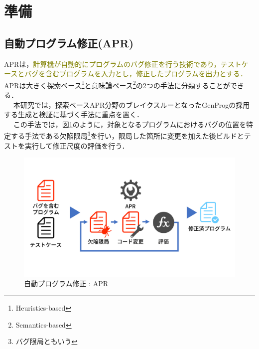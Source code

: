 \documentclass[uplatex,dvipdfmx,a4paper]{jsarticle}
\newcommand{\modifiedTwo}[1]{{\textcolor{olive}{#1}}}
\let\oldcite\cite
\renewcommand{\cite}[1]{\xspace\oldcite{#1}}
\begin{document}
\clearpage
\section{準備}\label{sec:prep}
\subsection{自動プログラム修正(APR)}\label{sec:apr}
APRは，\modifiedTwo{計算機が自動的にプログラムのバグ修正を行う技術であり，テストケースとバグを含むプログラムを入力とし，修正したプログラムを出力とする．}APRは大きく探索ベース\footnote{Heuristics-based}と意味論ベース\footnote{Semantics-based}\cite{le2018overfitting}の2つの手法に分類することができる．\\　
本研究では，探索ベースAPR分野のブレイクスルーとなったGenProg\cite{le2011genprog}の採用する生成と検証\cite{martinez2019astor}に基づく手法に重点を置く．\\　
この手法では，図\ref{fig:apr}のように，対象となるプログラムにおけるバグの位置を特定する手法である欠陥限局\footnote{バグ限局ともいう}を行い，限局した箇所に変更を加えた後ビルドとテストを実行して修正尺度の評価を行う．
\begin{figure}[t]
  \centering
  \includegraphics[width=\linewidth]{fig/apr.pdf}
  \caption{自動プログラム修正 : APR}
  \label{fig:apr}
\end{figure}
\end{document}

